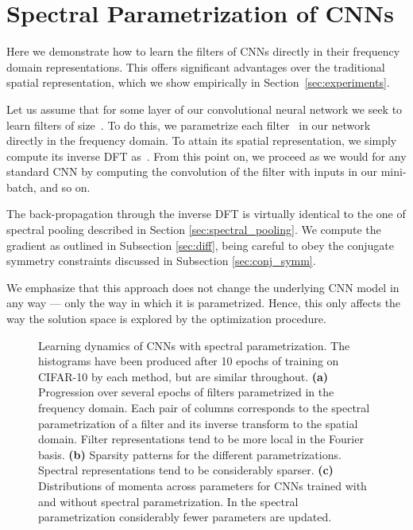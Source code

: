 \documentclass{article} \usepackage{nips15submit_e,times}
\begin{document}
\section{Spectral Parametrization of CNNs}
\label{sec:spectral_representations}
Here we demonstrate how to learn the filters of CNNs directly in their frequency domain representations.  This offers significant advantages over the traditional spatial representation, which we show empirically in Section~\ref{sec:experiments}.

Let us assume that for some layer of our convolutional neural network we seek to learn filters of size~. To do this, we parametrize each filter~ in our network directly in the frequency domain. To attain its spatial representation, we simply compute its inverse DFT as~. From this point on, we proceed as we would for any standard CNN by computing the convolution of the filter with inputs in our mini-batch, and so on.

The back-propagation through the inverse DFT is virtually identical to the one of spectral pooling described in Section \ref{sec:spectral_pooling}. We compute the gradient as outlined in Subsection \ref{sec:diff}, being careful to obey the conjugate symmetry constraints discussed in Subsection \ref{sec:conj_symm}. 

We emphasize that this approach does not change the underlying CNN model in any way --- only the way in which it is parametrized. Hence, this only affects the way the solution space is explored by the optimization procedure.


\begin{figure*}[t]
\centering {}
  \hfill
{}
  \hfill
{}
\caption{Learning dynamics of CNNs with spectral parametrization. The histograms have been produced after 10 epochs of training on CIFAR-10 by each method, but are similar throughout. {\bf (a)} Progression over several epochs of filters parametrized in the frequency domain. Each pair of columns corresponds to the spectral parametrization of a filter and its inverse transform to the spatial domain. Filter representations tend to be more local in the Fourier basis. {\bf (b)} Sparsity patterns for the different parametrizations. Spectral representations tend to be considerably sparser. {\bf (c)} Distributions of momenta across parameters for CNNs trained with and without spectral parametrization. In the spectral parametrization considerably fewer parameters are updated.}
\label{fig:learning_dynamics}
\end{figure*}
\end{document}
